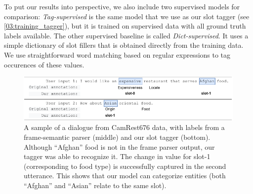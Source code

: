 To put our results into perspective, we also include two supervised models for comparison:
\emph{Tag-supervised} is the same model that we use as our slot tagger (see \ref{03:training_tagger}), but it is trained on supervised data with all ground truth labels available.
The other supervised baseline is called \emph{Dict-supervised}.
It uses a simple dictionary of slot fillers that is obtained directly from the training data.
We use straightforward word matching based on regular expressions to tag occurences of these values.
\begin{figure}[h]
\includegraphics[width=1.0\textwidth]{images/label_example.pdf}
        \caption{A sample of a dialogue from CamRest676 data, with labels from a frame-semantic parser (middle) and our slot tagger (bottom).
        Although ``Afghan'' food is not in the frame parser output, our tagger was able to recognize it. The change in value for slot-1 (corresponding to food type) is successfully captured in the second utterance. This shows that our model can categorize entities (both ``Afghan'' and ``Asian'' relate to the same slot).}
    \label{fig:example}
\end{figure}

